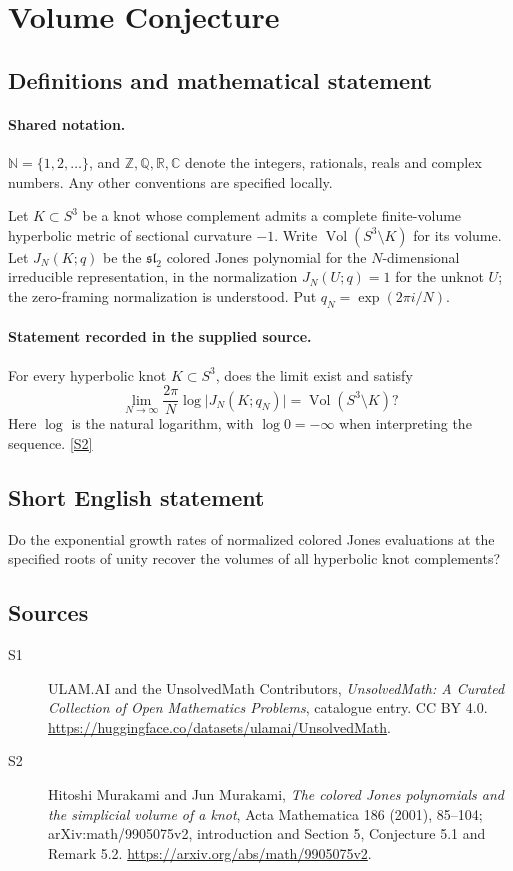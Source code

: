 \documentclass[11pt]{article}
\newcommand{\sref}[2]{\hyperlink{source:#1:#2}{[S#2]}}
\begin{document}
\section{Volume Conjecture}\label{statement}

\subsection{Definitions and mathematical statement}

\paragraph{Shared notation.}$\mathbb N=\{1,2,\ldots\}$, and $\mathbb Z,\mathbb Q,\mathbb R,\mathbb C$ denote the integers, rationals, reals and complex numbers. Any other conventions are specified locally.


Let $K\subset S^3$ be a knot whose complement admits a complete finite-volume hyperbolic metric of sectional curvature $-1$. Write $\operatorname{Vol}(S^3\setminus K)$ for its volume. Let $J_N(K;q)$ be the $\mathfrak{sl}_2$ colored Jones polynomial for the $N$-dimensional irreducible representation, in the normalization $J_N(U;q)=1$ for the unknot $U$; the zero-framing normalization is understood. Put $q_N=\exp(2\pi i/N)$.
\paragraph{Statement recorded in the supplied source.}
For every hyperbolic knot $K\subset S^3$, does the limit exist and satisfy
\[
 \lim_{N\to\infty}\frac{2\pi}{N}\log\bigl|J_N(K;q_N)\bigr|
 =\operatorname{Vol}(S^3\setminus K)?
\]
Here $\log$ is the natural logarithm, with $\log 0=-\infty$ when interpreting the sequence. \sref{statement}{2}
\subsection{Short English statement}
Do the exponential growth rates of normalized colored Jones evaluations at the specified roots of unity recover the volumes of all hyperbolic knot complements?
\subsection{Sources}
\begin{description}
\item[\hypertarget{source:statement:1}{S1}] ULAM.AI and the UnsolvedMath Contributors, \emph{UnsolvedMath: A Curated Collection of Open Mathematics Problems}, catalogue entry. CC BY 4.0. \url{https://huggingface.co/datasets/ulamai/UnsolvedMath}.
\item[\hypertarget{source:statement:2}{S2}] Hitoshi Murakami and Jun Murakami, \emph{The colored Jones polynomials and the simplicial volume of a knot}, Acta Mathematica 186 (2001), 85--104; arXiv:math/9905075v2, introduction and Section 5, Conjecture 5.1 and Remark 5.2. \url{https://arxiv.org/abs/math/9905075v2}.
\end{description}
\label{end:statement}
\end{document}
